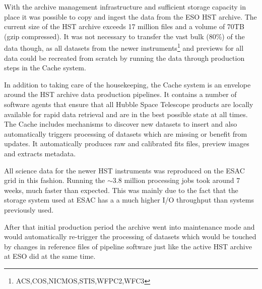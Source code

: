 With the archive management infrastructure and sufficient storage capacity in place it was possible to copy and ingest the data from the ESO HST archive. The current size of the HST archive exceeds 17 million files and a volume of 70TB (gzip compressed). It was not necessary to transfer the vast bulk (80\%) of the data though, as all datasets from the newer instruments\footnote{ACS,COS,NICMOS,STIS,WFPC2,WFC3} and previews for all data could be recreated from scratch by running the data through production steps in the Cache system. 

In addition to taking care of the housekeeping, the Cache system is an envelope around the HST archive data production pipelines. It contains a number of software agents that ensure that all Hubble Space Telescope products are locally available for rapid data retrieval and are in the best possible state at all times.  The Cache includes mechanisms to discover new datasets to insert and also automatically triggers processing of datasets which are missing or benefit from updates. It automatically produces raw and calibrated fits files, preview images and extracts metadata.

All science data for the newer HST instruments was reproduced on the ESAC grid in this fashion. Running the $\sim$3.8 million processing jobs took around 7 weeks, much faster than expected. This was mainly due to the fact that the storage system used at ESAC has a a much higher I/O throughput than systems previously used.

After that initial production period the archive went into maintenance mode and would automatically re-trigger the processing of datasets which would be touched by changes in reference files of pipeline software just like the active HST archive at ESO did at the same time.

